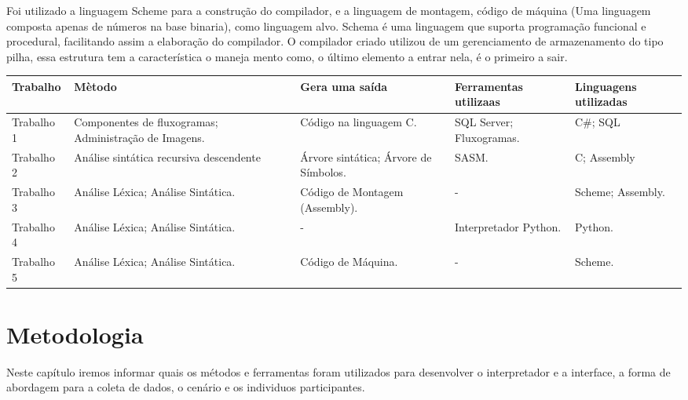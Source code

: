 \documentclass[12pt,oneside,a4paper,chapter=TITLE,section=TITLE,sumario=tradicional]{abntex2}
\begin{document}
Foi utilizado a linguagem Scheme para a construção do compilador, e a linguagem de montagem, código de máquina (Uma linguagem composta apenas de números na base binaria), como linguagem alvo. Schema é uma linguagem que suporta programação funcional e procedural, facilitando assim a elaboração do compilador. O compilador criado utilizou de um gerenciamento de armazenamento do tipo pilha, essa estrutura tem a característica o maneja mento como, o último elemento a entrar nela, é o primeiro a sair.

\begin{quadro}[htb]
    \centering
    \vspace{0.5cm}
    \begin{tabular}{|p{3.0cm}||p{3.0cm}|p{3.0cm}|p{3.0cm}|p{3.0cm}|}
        \hline
        \textbf{Trabalho} & \textbf{Mètodo} & \textbf{Gera uma saída} & \textbf{Ferramentas utilizaas} & \textbf{Linguagens utilizadas} \\ 
        \hline\hline
        Trabalho 1 & Componentes de fluxogramas; Administração de Imagens. & Código na linguagem C.   &  SQL Server; Fluxogramas. & C\#; SQL    \\ \hline 
        Trabalho 2 & Análise sintática recursiva descendente    & Árvore sintática; Árvore de Símbolos.   & SASM.  & C; Assembly  \\ \hline
        Trabalho 3 & Análise Léxica; Análise Sintática.   & Código de Montagem (Assembly).  &  -  & Scheme; Assembly.  \\ \hline
        Trabalho 4 & Análise Léxica; Análise Sintática.   & -   &  Interpretador Python.  & Python.   \\ \hline
        Trabalho 5 & Análise Léxica; Análise Sintática.   &  Código de Máquina.   & -   & Scheme.   \\ \hline
    \end{tabular}

    
\end{quadro}



\chapter{Metodologia}
\label{cap:metodologia}

Neste capítulo iremos informar quais os métodos e ferramentas foram utilizados para desenvolver o interpretador e a interface, a forma de abordagem para a coleta de dados, o cenário e os individuos participantes.
\end{document}
